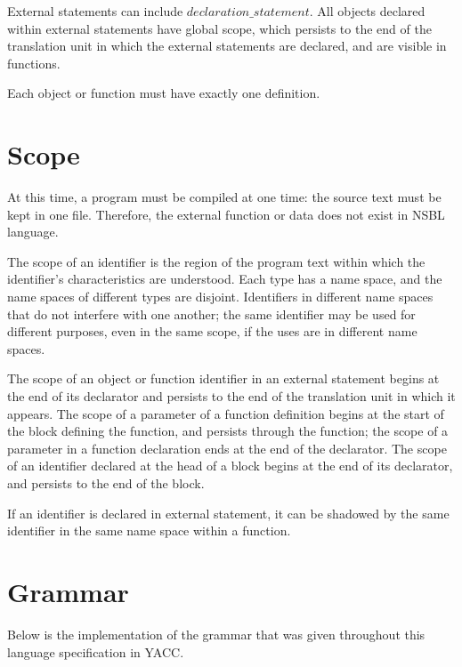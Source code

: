 \documentclass[letterpaper,12pt]{article}
\begin{document}
External statements can include $declaration\_statement$.
All objects declared within external statements have global scope, which persists to the end of the translation unit in which the external statements are declared, and are visible in functions. \newline

Each object or function must have exactly one definition. \newline

\section{Scope}\label{sec:scope}
At this time, a program must be compiled at one time: the source text must be kept in one file. Therefore, the external function or data does not exist in NSBL language. \newline

The scope of an identifier is the region of the program text within which the identifier's characteristics are understood. 
Each type has a name space, and the name spaces of different types are disjoint. 
Identifiers in different name spaces that do not interfere with one another; the same identifier may be used for different purposes, even in the same scope, if the uses are in different name spaces. \newline

The scope of an object or function identifier in an external statement begins at the end of its declarator and persists to the end of the translation unit in which it appears. The scope of a parameter of a function definition begins at the start of the block defining the function, and persists through the function; the scope of a parameter in a function declaration ends at the end of the declarator. The scope of an identifier declared at the head of a block begins at the end of its declarator, and persists to the end of the block. \newline

If an identifier is declared in external statement, it can be shadowed by the same identifier in the same name space within a function. 

\section{Grammar}\label{sec:grammar}
Below is the implementation of the grammar that was given throughout this language specification in YACC.

\end{document}
